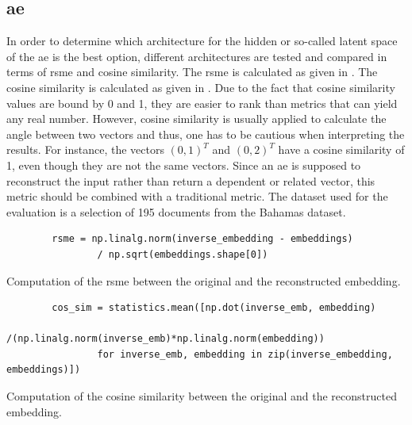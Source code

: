 \subsection*{\ac{ae}}\label{subsec:evaluation-ae}

In order to determine which architecture for the hidden or so-called latent space of the \ac{ae} is the best option, 
different architectures are tested and compared in terms of \ac{rsme} and cosine similarity.
The \ac{rsme} is calculated as given in .
The cosine similarity is calculated as given in .
Due to the fact that cosine similarity values are bound by 0 and 1, they are easier to rank than metrics that can yield any real number.
However, cosine similarity is usually applied to calculate the angle between two vectors and thus, one has to be cautious when interpreting the results.
For instance, the vectors $\left( 0, 1 \right)^T$ and $\left( 0, 2 \right)^T$ have a cosine similarity of 1, even though they are not the same vectors.
Since an \ac{ae} is supposed to reconstruct the input rather than return a dependent or related vector, this metric should be combined with a traditional metric.
The dataset used for the evaluation is a selection of 195 documents from the Bahamas dataset.

\begin{listing}[htp]
    \begin{verbatim}
        rsme = np.linalg.norm(inverse_embedding - embeddings) 
                / np.sqrt(embeddings.shape[0])
    \end{verbatim}
    \caption[Computation of the \acs*{rsme}]{
        Computation of the \acs*{rsme} between the original and the reconstructed embedding.
    }
    \label{lst:impl-rsme}
\end{listing}

\begin{listing}[htp]
    \begin{verbatim}
        cos_sim = statistics.mean([np.dot(inverse_emb, embedding)
                /(np.linalg.norm(inverse_emb)*np.linalg.norm(embedding)) 
                for inverse_emb, embedding in zip(inverse_embedding, embeddings)])
    \end{verbatim}
    \caption[Computation of the cosine similarity]{
        Computation of the cosine similarity between the original and the reconstructed embedding.
    }
    \label{lst:impl-cos_sim}
\end{listing}

